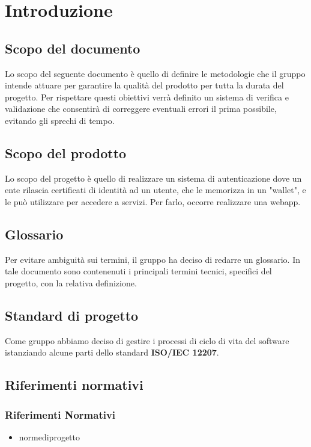 \section{Introduzione}
\subsection{Scopo del documento}
Lo scopo del seguente documento è quello di definire le metodologie che il gruppo intende attuare per garantire la qualità del prodotto per tutta la durata del progetto.
Per rispettare questi obiettivi verrà definito un sistema di verifica e validazione che consentirà di correggere eventuali errori il prima possibile, evitando gli sprechi di tempo.
\subsection{Scopo del prodotto} %
Lo scopo del progetto è quello di realizzare un sistema di autenticazione dove un ente rilascia
certificati di identità ad un utente, che le memorizza in un "wallet", e le può utilizzare
per accedere a servizi. Per farlo, occorre realizzare una webapp.
\subsection{Glossario}
Per evitare ambiguità sui termini, il gruppo ha deciso di redarre un glossario. In tale documento sono contenenuti i principali termini tecnici, specifici del progetto, con la relativa definizione.
\subsection{Standard di progetto}
Come gruppo abbiamo deciso di gestire i processi di ciclo di vita del software istanziando alcune parti dello standard \textbf{ISO/IEC 12207}.
\subsection{Riferimenti normativi}%
\subsubsection{Riferimenti Normativi}
\begin{itemize}
    \item normediprogetto 
\end{itemize}
